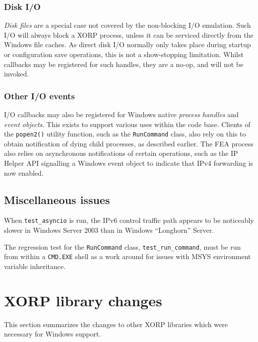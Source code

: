 \documentclass[11pt]{article}
\begin{document}
{\subsubsection{Disk I/O}

{\em Disk files} are a special case not covered by the non-blocking
I/O emulation. Such I/O will always block a XORP process, unless it
can be serviced directly from the Windows file caches.
As direct disk I/O normally only takes place during startup or configuration
save operations, this is not a show-stopping limitation.
Whilst callbacks may be registered for such handles, they are a no-op,
and will not be invoked.

\subsubsection{Other I/O events}

I/O callbacks may also be registered for Windows native
{\em process handles} and {\em event objects}.
This exists to support various uses within the code base.
Clients of the {\tt popen2()}
utility function, such as the {\tt RunCommand} class,
also rely on this to obtain notification
of dying child processes, as described earlier.
The FEA process also relies on asynchronous notifications
of certain operations, such as the IP Helper API
signalling a Windows event object to indicate that
IPv4 forwarding is now enabled.

\subsection{Miscellaneous issues}

When {\tt test\_asyncio} is run, the IPv6 control traffic path appears
to be noticeably slower in Windows Server 2003
than in Windows ``Longhorn'' Server.

The regression test for the {\tt RunCommand} class, {\tt test\_run\_command},
must be run from within a {\tt CMD.EXE} shell as a work around for
issues with MSYS environment variable inheritance.

\section{XORP library changes}

This section summarizes the changes to other XORP libraries which were
necessary for Windows support.

}
\end{document}
